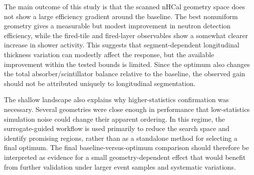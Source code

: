\noindent The main outcome of this study is that the scanned nHCal geometry space does not show a large efficiency gradient around the baseline. The best nonuniform geometry gives a measurable but modest improvement in neutron detection efficiency, while the fired-tile and fired-layer observables show a somewhat clearer increase in shower activity. This suggests that segment-dependent longitudinal thickness variation can modestly affect the response, but the available improvement within the tested bounds is limited. Since the optimum also changes the total absorber/scintillator balance relative to the baseline, the observed gain should not be attributed uniquely to longitudinal segmentation.

\noindent The shallow landscape also explains why higher-statistics confirmation was necessary. Several geometries were close enough in performance that low-statistics simulation noise could change their apparent ordering. In this regime, the surrogate-guided workflow is used primarily to reduce the search space and identify promising regions, rather than as a standalone method for selecting a final optimum. The final baseline-versus-optimum comparison should therefore be interpreted as evidence for a small geometry-dependent effect that would benefit from further validation under larger event samples and systematic variations.
